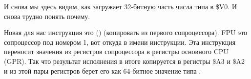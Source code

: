 


И снова мы здесь видим, как  загружает 32-битную часть числа типа \Tdouble в \$V0.
И снова трудно понять почему.

Новая для нас инструкция это  () (копировать из первого сопроцессора).
FPU это сопроцессор под номером 1, вот откуда  в имени инструкции.
Эта инструкция переносит значения из регистров сопроцессора в регистры основного CPU (\ac{GPR}).
Так что результат исполнения  в итоге копируется в регистры \$A3 и \$A2
и из этой пары регистров \printf берет его как 64-битное значение типа \Tdouble.

